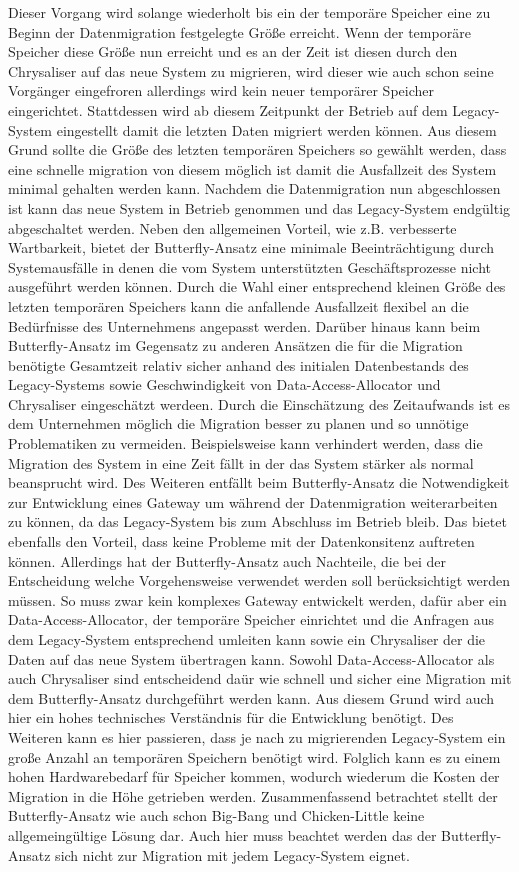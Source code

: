 \lb
Dieser Vorgang wird solange wiederholt bis ein der temporäre Speicher eine zu Beginn der Datenmigration festgelegte Größe erreicht. Wenn der temporäre Speicher diese Größe nun erreicht und es an der Zeit ist diesen durch den Chrysaliser auf das neue System zu migrieren, wird dieser wie auch schon seine Vorgänger eingefroren allerdings wird kein neuer temporärer Speicher eingerichtet. Stattdessen wird ab diesem Zeitpunkt der Betrieb auf dem Legacy-System eingestellt damit die letzten Daten migriert werden können.\citep[S. 202]{wuLawlessBisbal-1997} Aus diesem Grund sollte die Größe des letzten temporären Speichers so gewählt werden, dass eine schnelle migration von diesem möglich ist damit die Ausfallzeit des System minimal gehalten werden kann.\citep[S. 202]{wuLawlessBisbal-1997} Nachdem die Datenmigration nun abgeschlossen ist kann das neue System in Betrieb genommen und das Legacy-System endgültig abgeschaltet werden.\citep[S. 204]{wuLawlessBisbal-1997}
\lb
Neben den allgemeinen Vorteil, wie z.B. verbesserte Wartbarkeit, bietet der Butterfly-Ansatz eine minimale Beeinträchtigung durch Systemausfälle in denen die vom System unterstützten Geschäftsprozesse nicht ausgeführt werden können. Durch die Wahl einer entsprechend kleinen Größe des letzten temporären Speichers kann die anfallende Ausfallzeit flexibel an die Bedürfnisse des Unternehmens angepasst werden.\citep[S. 204f]{wuLawlessBisbal-1997} Darüber hinaus kann beim Butterfly-Ansatz im Gegensatz zu anderen Ansätzen die für die Migration benötigte Gesamtzeit relativ sicher anhand des initialen Datenbestands des Legacy-Systems sowie Geschwindigkeit von Data-Access-Allocator und Chrysaliser eingeschätzt werdeen. Durch die Einschätzung des Zeitaufwands ist es dem Unternehmen möglich die Migration besser zu planen und so unnötige Problematiken zu vermeiden. Beispielsweise kann verhindert werden, dass die Migration des System in eine Zeit fällt in der das System stärker als normal beansprucht wird.\cite[S. 204]{wuLawlessBisbal-1997} Des Weiteren entfällt beim Butterfly-Ansatz die Notwendigkeit zur Entwicklung eines Gateway um während der Datenmigration weiterarbeiten zu können, da das Legacy-System bis zum Abschluss im Betrieb bleib. Das bietet ebenfalls den Vorteil, dass keine Probleme mit der Datenkonsitenz auftreten können.\citep[S. 3]{wuLawless-1997}
\lb
Allerdings hat der Butterfly-Ansatz auch Nachteile, die bei der Entscheidung welche Vorgehensweise verwendet werden soll berücksichtigt werden müssen. So muss zwar kein komplexes Gateway entwickelt werden, dafür aber ein Data-Access-Allocator, der temporäre Speicher einrichtet und die Anfragen aus dem Legacy-System entsprechend umleiten kann sowie ein Chrysaliser der die Daten auf das neue System übertragen kann.\citep[S. 3]{wuLawless-1997} Sowohl Data-Access-Allocator als auch Chrysaliser sind entscheidend daür wie schnell und sicher eine Migration mit dem Butterfly-Ansatz durchgeführt werden kann. Aus diesem Grund wird auch hier ein hohes technisches Verständnis für die Entwicklung benötigt.\citep[S. 204]{wuLawlessBisbal-1997} Des Weiteren kann es hier passieren, dass je nach zu migrierenden Legacy-System ein große Anzahl an temporären Speichern benötigt wird. Folglich kann es zu einem hohen Hardwarebedarf für Speicher kommen, wodurch wiederum die Kosten der Migration in die Höhe getrieben werden.\citep[S. 109f]{bisbal-1999}
\lb
Zusammenfassend betrachtet stellt der Butterfly-Ansatz wie auch schon Big-Bang und Chicken-Little keine allgemeingültige Lösung dar. Auch hier muss beachtet werden das der Butterfly-Ansatz sich nicht zur Migration mit jedem Legacy-System eignet. 
